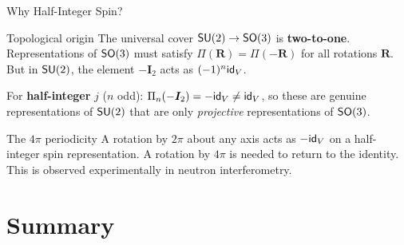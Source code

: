 \documentclass[9pt]{beamer}
\begin{document}
\begin{frame}{Why Half-Integer Spin?}
\begin{block}{Topological origin}
The universal cover $\operatorname{\mathsf{SU}}(2)\to\operatorname{\mathsf{SO}}(3)$ is \textbf{two-to-one}.
Representations of $\operatorname{\mathsf{SO}}(3)$ must satisfy
$\Pi(\bm R)=\Pi(-\bm R)$ for all rotations $\bm R$.
But in $\operatorname{\mathsf{SU}}(2)$, the element $-\bm I_2$ acts as $(-1)^n\mathsf{id}_V$.

\pause
\vspace{0.5em}
For \textbf{half-integer} $j$ ($n$ odd):
$\Pi_n\Br{-\bm I_2}=-\id_V\neq\id_V$, so these are genuine representations
of $\operatorname{\mathsf{SU}}(2)$ that are only \emph{projective} representations of $\operatorname{\mathsf{SO}}(3)$.
\end{block}

\pause
\begin{block}{The \texorpdfstring{$4\pi$}{4π} periodicity}
A rotation by $2\pi$ about any axis acts as $-\mathsf{id}_V$ on a half-integer
spin representation. A rotation by $4\pi$ is needed to return to the
identity. This is observed experimentally in neutron interferometry.
\end{block}
\end{frame}

\section{Summary}
\end{document}
